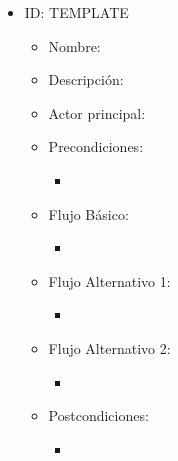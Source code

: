 \begin{itemize}
    \item ID: TEMPLATE
    \begin{itemize}
        \item Nombre:
        \item Descripción: 
       	\item Actor principal: 
       	\item Precondiciones: 
       		\begin{itemize}
       		    \item 
   		    \end{itemize}
    	\item Flujo Básico: 
       		\begin{itemize}
       		    \item 
   		    \end{itemize}
       	\item Flujo Alternativo 1: 
       		\begin{itemize}
       		    \item 
   		    \end{itemize}
       	\item Flujo Alternativo 2: 
       		\begin{itemize}
       		    \item 
   		    \end{itemize}
       	\item Postcondiciones: 
       		\begin{itemize}
       		    \item 
   		    \end{itemize} 		  
    \end{itemize}
\end{itemize}
